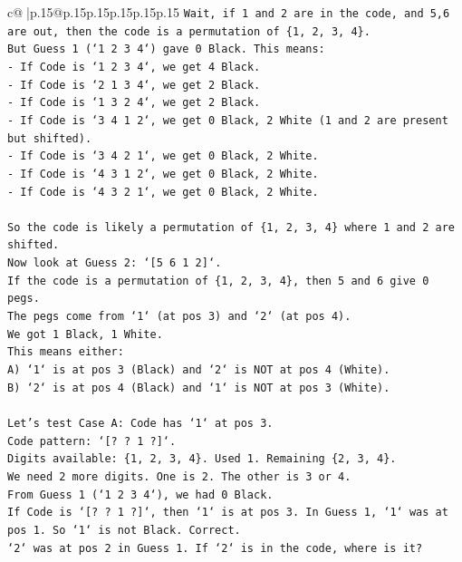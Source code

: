 \documentclass{article}
\begin{document}
{\begin{supertabular}{c@{$\;$}|p{.15\linewidth}@{}p{.15\linewidth}p{.15\linewidth}p{.15\linewidth}p{.15\linewidth}p{.15\linewidth}}
{{{\texttt{Wait, if 1 and 2 are in the code, and 5,6 are out, then the code is a permutation of \{1, 2, 3, 4\}.} \\
\texttt{But Guess 1 (`1 2 3 4`) gave 0 Black. This means:} \\
\texttt{{-} If Code is `1 2 3 4`, we get 4 Black.} \\
\texttt{{-} If Code is `2 1 3 4`, we get 2 Black.} \\
\texttt{{-} If Code is `1 3 2 4`, we get 2 Black.} \\
\texttt{{-} If Code is `3 4 1 2`, we get 0 Black, 2 White (1 and 2 are present but shifted).} \\
\texttt{{-} If Code is `3 4 2 1`, we get 0 Black, 2 White.} \\
\texttt{{-} If Code is `4 3 1 2`, we get 0 Black, 2 White.} \\
\texttt{{-} If Code is `4 3 2 1`, we get 0 Black, 2 White.} \\
\\ 
\texttt{So the code is likely a permutation of \{1, 2, 3, 4\} where 1 and 2 are shifted.} \\
\texttt{Now look at Guess 2: `{[}5 6 1 2{]}`.} \\
\texttt{If the code is a permutation of \{1, 2, 3, 4\}, then 5 and 6 give 0 pegs.} \\
\texttt{The pegs come from `1` (at pos 3) and `2` (at pos 4).} \\
\texttt{We got 1 Black, 1 White.} \\
\texttt{This means either:} \\
\texttt{A) `1` is at pos 3 (Black) and `2` is NOT at pos 4 (White).} \\
\texttt{B) `2` is at pos 4 (Black) and `1` is NOT at pos 3 (White).} \\
\\ 
\texttt{Let's test Case A: Code has `1` at pos 3.} \\
\texttt{Code pattern: `{[}? ? 1 ?{]}`.} \\
\texttt{Digits available: \{1, 2, 3, 4\}. Used 1. Remaining \{2, 3, 4\}.} \\
\texttt{We need 2 more digits. One is 2. The other is 3 or 4.} \\
\texttt{From Guess 1 (`1 2 3 4`), we had 0 Black.} \\
\texttt{If Code is `{[}? ? 1 ?{]}`, then `1` is at pos 3. In Guess 1, `1` was at pos 1. So `1` is not Black. Correct.} \\
\texttt{`2` was at pos 2 in Guess 1. If `2` is in the code, where is it?} \\
}}}
\end{supertabular}}
\end{document}
